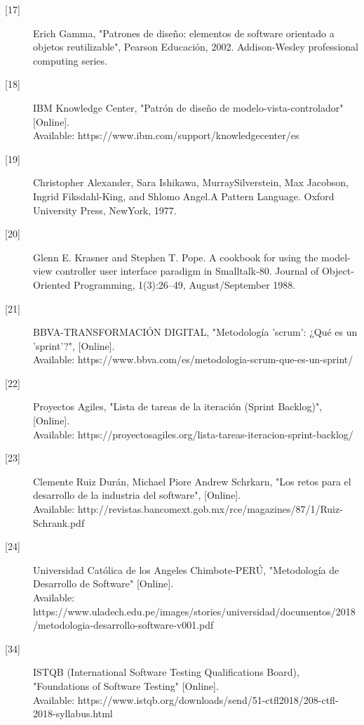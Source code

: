 \begin{description}
		\item[\hypertarget{b17}{[17]}]	Erich Gamma, "Patrones de diseño: elementos de software orientado a objetos reutilizable", Pearson Educación, 2002. Addison-Wesley professional computing series.
		
		\item[\hypertarget{b18}{[18]}] IBM Knowledge Center, "Patrón de diseño de modelo-vista-controlador" [Online].\\ Available: https://www.ibm.com/support/knowledgecenter/es
		
		\item[\hypertarget{b19}{[19]}] Christopher Alexander, Sara Ishikawa, MurraySilverstein, Max Jacobson,
		Ingrid Fiksdahl-King, and Shlomo Angel.A Pattern Language. Oxford University
		Press, NewYork, 1977.
		
		\item[\hypertarget{b20}{[20]}] Glenn E. Krasner and Stephen T. Pope. A cookbook for using the model-view
		controller user interface paradigm in Smalltalk-80. Journal of Object-Oriented Programming, 1(3):26–49, August/September 1988.
		
		\item[\hypertarget{b21}{[21]}] BBVA-TRANSFORMACIÓN DIGITAL, "Metodología 'scrum': ¿Qué es un 'sprint'?", [Online].\\ Available: https://www.bbva.com/es/metodologia-scrum-que-es-un-sprint/
		
		\item[\hypertarget{b22}{[22]}] Proyectos Agiles, "Lista de tareas de la iteración (Sprint Backlog)", [Online].\\ Available: https://proyectosagiles.org/lista-tareas-iteracion-sprint-backlog/
		
		\item[\hypertarget{b23}{[23]}] Clemente Ruiz Durán, Michael Piore
		Andrew Schrkarn, "Los retos para el desarrollo
		de la industria del software", [Online].\\ Available: http://revistas.bancomext.gob.mx/rce/magazines/87/1/Ruiz-Schrank.pdf

		\item[\hypertarget{b24}{[24]}] Universidad Católica de los Angeles Chimbote-PERÚ, "Metodología de Desarrollo de Software"  [Online].\\ Available: https://www.uladech.edu.pe/images/stories/universidad/documentos/2018/metodologia-desarrollo-software-v001.pdf
		
		\item[\hypertarget{b34}{[34]}] ISTQB (International Software Testing Qualifications Board), "Foundations of Software Testing" [Online].\\ Available: 
		https://www.istqb.org/downloads/send/51-ctfl2018/208-ctfl-2018-syllabus.html
		

\end{description}
